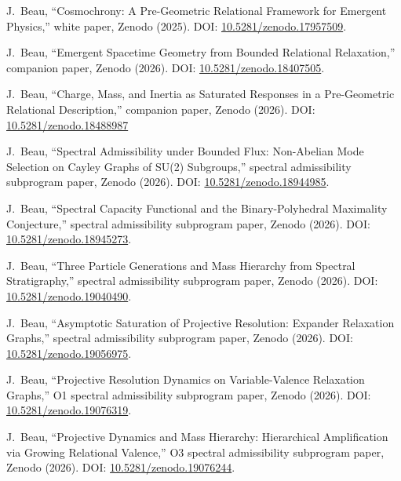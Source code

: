 J.~Beau,
``Cosmochrony: A Pre-Geometric Relational Framework for Emergent Physics,''
white paper, Zenodo (2025).
DOI: \href{https://doi.org/10.5281/zenodo.17957509}{10.5281/zenodo.17957509}.

J.~Beau,
``Emergent Spacetime Geometry from Bounded Relational Relaxation,''
companion paper, Zenodo (2026).
DOI: \href{https://doi.org/10.5281/zenodo.18407505}{10.5281/zenodo.18407505}.

J.~Beau,
``Charge, Mass, and Inertia as Saturated Responses in a Pre-Geometric Relational Description,''
companion paper, Zenodo (2026).
DOI: \href{https://doi.org/10.5281/zenodo.18488987}{10.5281/zenodo.18488987}

J.~Beau,
``Spectral Admissibility under Bounded Flux: Non-Abelian Mode Selection on Cayley Graphs of SU(2) Subgroups,''
spectral admissibility subprogram paper, Zenodo (2026).
DOI: \href{https://doi.org/10.5281/zenodo.18944985}{10.5281/zenodo.18944985}.

J.~Beau,
``Spectral Capacity Functional and the Binary-Polyhedral Maximality Conjecture,''
spectral admissibility subprogram paper, Zenodo (2026).
DOI: \href{https://doi.org/10.5281/zenodo.18945273}{10.5281/zenodo.18945273}.

J.~Beau,
``Three Particle Generations and Mass Hierarchy from Spectral Stratigraphy,''
spectral admissibility subprogram paper, Zenodo (2026).
DOI: \href{https://doi.org/10.5281/zenodo.19040490}{10.5281/zenodo.19040490}.

J.~Beau,
``Asymptotic Saturation of Projective Resolution: Expander Relaxation Graphs,''
spectral admissibility subprogram paper, Zenodo (2026).
DOI: \href{https://doi.org/10.5281/zenodo.19056975}{10.5281/zenodo.19056975}.

J.~Beau,
``Projective Resolution Dynamics on Variable-Valence Relaxation Graphs,''
O1 spectral admissibility subprogram paper, Zenodo (2026).
DOI: \href{https://doi.org/10.5281/zenodo.19076319}{10.5281/zenodo.19076319}.

J.~Beau,
``Projective Dynamics and Mass Hierarchy: Hierarchical Amplification via Growing Relational Valence,''
O3 spectral admissibility subprogram paper, Zenodo (2026).
DOI: \href{https://doi.org/10.5281/zenodo.19076244}{10.5281/zenodo.19076244}.

